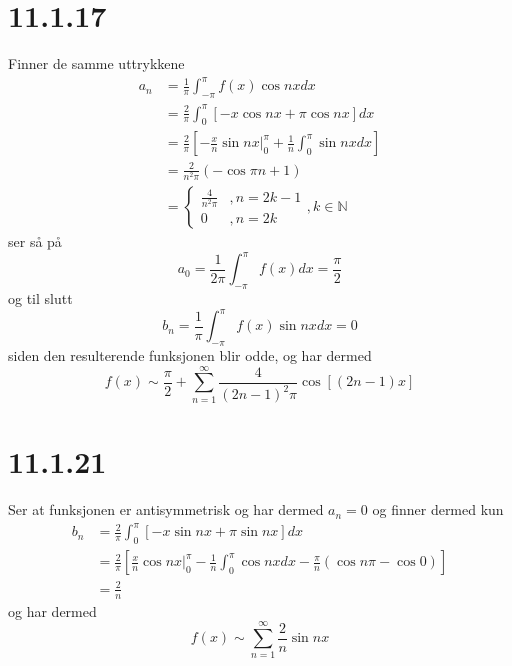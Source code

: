 \documentclass{report}
\newcommand{\M}[2]{\mathbb{#1}^{#2}}
\newcommand{\nbrack}[1]{\left( #1 \right)}
\newcommand{\bbrack}[1]{\left[ #1 \right]}
\begin{document}
\section*{11.1.17}
Finner de samme uttrykkene
\begin{equation}
  \label{eq:6}
  \begin{split}
    a_{n} &= \frac{1}{\pi} \int_{-\pi}^{\pi} f(x) \cos nx dx \\
          &= \frac{2}{\pi} \int_{0}^{\pi} \bbrack{ -x\cos nx + \pi\cos nx}dx \\
          &= \frac{2}{\pi} \bbrack{ -\frac{x}{n} \sin nx \Big|_{0}^{\pi} + \frac{1}{n} \int_{0}^{\pi} \sin nx dx } \\
          &= \frac{2}{n^{2} \pi} \nbrack{ - \cos \pi n + 1 } \\
    &= \left\lbrace
      \begin{array}{ll}
        \frac{4}{n^{2}\pi} & , n = 2k-1 \\
        0 & , n = 2k
      \end{array} \right. , k\in \M{N}{}
  \end{split}
\end{equation}
ser så på
\begin{equation}
  \label{eq:7}
  a_{0} = \frac{1}{2\pi} \int_{-\pi}^{\pi} f(x) dx = \frac{\pi}{2}
\end{equation}
og til slutt
\begin{equation}
  \label{eq:8}
  b_{n} = \frac{1}{\pi} \int_{-\pi}^{\pi} f(x) \sin nx dx = 0
\end{equation}
siden den resulterende funksjonen blir odde, og har dermed
\begin{equation}
  \label{eq:9}
  f(x) \sim \frac{\pi}{2} + \sum_{n=1}^{\infty} \frac{4}{(2n-1)^{2}\pi} \cos \bbrack{ \nbrack{2n-1}x }
\end{equation}


\section*{11.1.21}
Ser at funksjonen er antisymmetrisk og har dermed $a_{n} = 0$ og finner dermed kun
\begin{equation}
  \label{eq:10}
  \begin{split}
    b_{n} &= \frac{2}{\pi} \int_{0}^{\pi} \bbrack{ -x \sin nx + \pi \sin nx}dx \\
    &= \frac{2}{\pi} \bbrack{ \frac{x}{n} \cos nx \Big|_{0}^{\pi} - \frac{1}{n} \int_{0}^{\pi} \cos nx dx - \frac{\pi}{n} \nbrack{ \cos n \pi - \cos 0 } } \\
    &= \frac{2}{n}
  \end{split}
\end{equation}
og har dermed
\begin{equation}
  \label{eq:11}
  f(x) \sim \sum_{n=1}^{\infty} \frac{2}{n} \sin nx
\end{equation}
\end{document}
